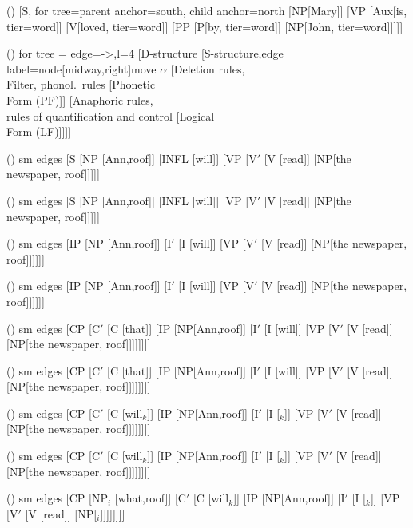 \begin {forest}()
 [S, for tree={parent anchor=south, child anchor=north} [NP[Mary]] [VP [Aux[is, tier=word]] [V[loved, tier=word]] [PP [P[by, tier=word]] [NP[John, tier=word]]]]] \end {forest}
\begin {forest}()
 for tree = {edge={->},l=4\baselineskip } [D-structure [S-structure,edge label={node[midway,right]{move $\alpha $}} [Deletion rules{,}\\Filter{,} phonol.\ rules [Phonetic\\Form (PF)]] [Anaphoric rules{,}\\rules of quantification and control [Logical\\Form (LF)]]]] \end {forest}
\begin {forest}()
 sm edges [S [NP [Ann,roof]] [INFL [will]] [VP [V$'$ [V [read]] [NP[the newspaper, roof]]]]] \end {forest}
\begin {forest}()
 sm edges [S [NP [Ann,roof]] [INFL [will]] [VP [V$'$ [V [read]] [NP[the newspaper, roof]]]]] \end {forest}
\begin {forest}()
 sm edges [IP [NP [Ann,roof]] [I$'$ [I [will]] [VP [V$'$ [V [read]] [NP[the newspaper, roof]]]]]] \end {forest}
\begin {forest}()
 sm edges [IP [NP [Ann,roof]] [I$'$ [I [will]] [VP [V$'$ [V [read]] [NP[the newspaper, roof]]]]]] \end {forest}
\begin {forest}()
 sm edges [CP [C$'$ [C [that]] [IP [NP[Ann,roof]] [I$'$ [I [will]] [VP [V$'$ [V [read]] [NP[the newspaper, roof]]]]]]]] \end {forest}
\begin {forest}()
 sm edges [CP [C$'$ [C [that]] [IP [NP[Ann,roof]] [I$'$ [I [will]] [VP [V$'$ [V [read]] [NP[the newspaper, roof]]]]]]]] \end {forest}
\begin {forest}()
 sm edges [CP [C$'$ [C [will$_k$]] [IP [NP[Ann,roof]] [I$'$ [I [\trace $_k$]] [VP [V$'$ [V [read]] [NP[the newspaper, roof]]]]]]]] \end {forest}
\begin {forest}()
 sm edges [CP [C$'$ [C [will$_k$]] [IP [NP[Ann,roof]] [I$'$ [I [\trace $_k$]] [VP [V$'$ [V [read]] [NP[the newspaper, roof]]]]]]]] \end {forest}
\begin {forest}()
 sm edges [CP [NP$_i$ [what,roof]] [C$'$ [C [will$_k$]] [IP [NP[Ann,roof]] [I$'$ [I [\trace $_k$]] [VP [V$'$ [V [read]] [NP[\trace $_i$]]]]]]]] \end {forest}
